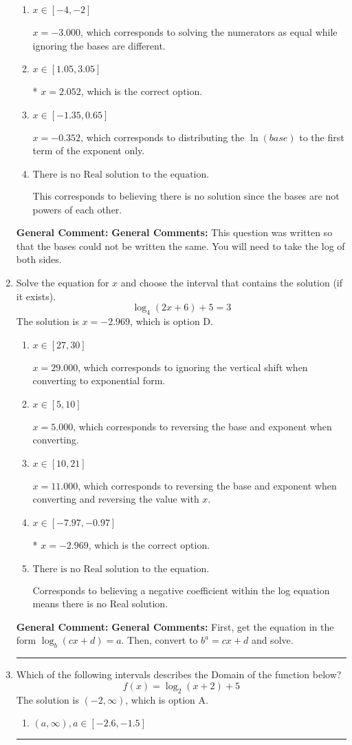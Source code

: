 \documentclass{extbook}[14pt]
\newcommand{\litem}[1]{\item #1

\rule{\textwidth}{0.4pt}}
\begin{document}
\begin{enumerate}
{\begin{enumerate}[label=\Alph*.]
$x = 17.481$, which corresponds to distributing the $\ln(base)$ to the second term of the exponent only.
\item \( x \in [-4, -2] \)

$x = -3.000$, which corresponds to solving the numerators as equal while ignoring the bases are different.
\item \( x \in [1.05, 3.05] \)

* $x = 2.052$, which is the correct option.
\item \( x \in [-1.35, 0.65] \)

$x = -0.352$, which corresponds to distributing the $\ln(base)$ to the first term of the exponent only.
\item \( \text{There is no Real solution to the equation.} \)

This corresponds to believing there is no solution since the bases are not powers of each other.
\end{enumerate}

\textbf{General Comment:} \textbf{General Comments:} This question was written so that the bases could not be written the same. You will need to take the log of both sides.
}
\litem{
Solve the equation for $x$ and choose the interval that contains the solution (if it exists).
\[ \log_{4}{(2x+6)}+5 = 3 \]The solution is \( x = -2.969 \), which is option D.\begin{enumerate}[label=\Alph*.]
\item \( x \in [27, 30] \)

$x = 29.000$, which corresponds to ignoring the vertical shift when converting to exponential form.
\item \( x \in [5, 10] \)

$x = 5.000$, which corresponds to reversing the base and exponent when converting.
\item \( x \in [10, 21] \)

$x = 11.000$, which corresponds to reversing the base and exponent when converting and reversing the value with $x$.
\item \( x \in [-7.97, -0.97] \)

* $x = -2.969$, which is the correct option.
\item \( \text{There is no Real solution to the equation.} \)

Corresponds to believing a negative coefficient within the log equation means there is no Real solution.
\end{enumerate}

\textbf{General Comment:} \textbf{General Comments:} First, get the equation in the form $\log_b{(cx+d)} = a$. Then, convert to $b^a = cx+d$ and solve.
}
\litem{
Which of the following intervals describes the Domain of the function below?
\[ f(x) = \log_2{(x+2)}+5 \]The solution is \( (-2, \infty) \), which is option A.\begin{enumerate}[label=\Alph*.]
\item \( (a, \infty), a \in [-2.6, -1.5] \)


\end{enumerate}}
\end{enumerate}
\end{document}
